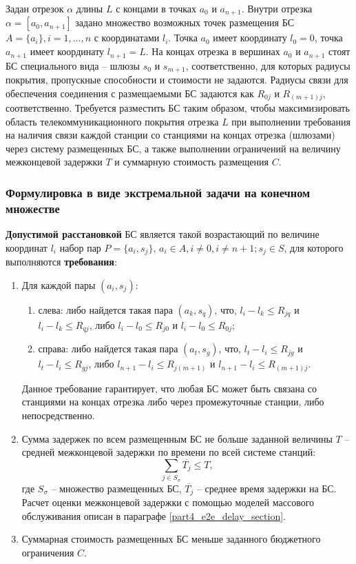 Задан отрезок $\alpha$ длины $L$ с концами в точках $a_0$ и $a_{n+1}$. Внутри отрезка $\alpha = [a_0, a_{n+1}]$ задано множество возможных точек размещения БС $A=\{a_i \},i=1,...,n$ с координатами $l_i$. Точка $a_0$ имеет координату $l_0=0$, точка $a_{n+1}$ имеет координату $l_{n+1}=L$. На концах отрезка в вершинах $a_0$ и $a_{n+1}$ стоят БС специального вида -- шлюзы $s_0$ и $s_{m+1}$, соответственно, для которых радиусы покрытия, пропускные способности и стоимости не задаются. Радиусы связи для обеспечения соединения с размещаемыми БС задаются как $R_{0j}$ и $R_{(m+1)j}$, соответственно.
Требуется разместить БС таким образом, чтобы максимизировать область телекоммуникационного покрытия отрезка $L$ при выполнении требования на наличия связи каждой станции со станциями на концах отрезка (шлюзами) через систему размещенных БС, а также выполнении ограничений на величину межконцевой задержки $T$ и суммарную стоимость размещения $C$.


\subsubsection{Формулировка в виде экстремальной задачи на конечном множестве}

\textbf{Допустимой расстановкой} БС является такой возрастающий по величине координат $l_i$  набор пар $P = \{a_i, s_j\}, \, a_i \in A,i \neq 0,i \neq n+1;s_j \in S$, для которого выполняются \textbf{требования}:

\begin{enumerate}
  \item  Для каждой пары $(a_i,s_j)$:
      \begin{enumerate}
          \item слева: либо найдется такая пара $(a_k,s_q)$, что, $l_i - l_k \leqslant R_{jq}$  и $l_i - l_k  \leqslant R_{qj}$, либо $l_i-l_0 \leqslant R_{j0}$ и $l_i - l_0 \leqslant R_{0j}$;
          \item справа: либо найдется такая пара $(a_t,s_g)$, что, $l_t-l_i \leqslant R_{jg}$ и $l_t - l_i \leqslant R_{gj}$, либо $l_{n+1}-l_i \leqslant R_{j(m+1)}$ и $l_{n+1}-l_i \leqslant R_{(m+1)j}$. 
\end{enumerate}
Данное требование гарантирует, что любая БС может быть связана со станциями на концах отрезка либо через промежуточные станции, либо непосредственно.
  \item Сумма задержек по всем размещенным БС не больше заданной величины $T$ – средней межконцевой задержки по времени по всей системе станций:
  \begin{displaymath}
      \label{eq:part3_e2e_delay}
      \sum\limits_{j \in S_\sigma} \overline{T_j} \leqslant T,
  \end{displaymath}
где $S_\sigma$ – множество размещенных БС, $\overline{T_j}$ -- среднее время задержки на БС. Расчет оценки межконцевой задержки с помощью моделей массового обслуживания описан в параграфе \cref{part4_e2e_delay_section}.
  \item Суммарная стоимость размещенных БС меньше заданного бюджетного ограничения  $C$.
\end{enumerate}


